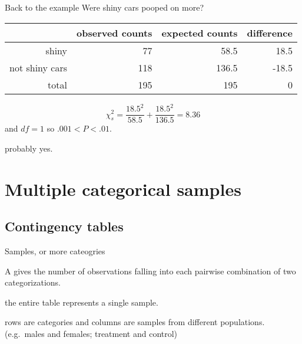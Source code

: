 \begin{frame}{Back to the example}
    Were shiny cars pooped on more?
    \begin{center}
        \begin{tabular}{rrrr}
            & observed counts & expected counts & difference \\
            \hline 
            shiny & 77 & 58.5 & 18.5 \\
            not shiny cars & 118 & 136.5 & -18.5 \\
            \hline
            total & 195 & 195  & 0 
        \end{tabular}
    \end{center}

    \vspace{2em}
    \[ \chi^2_s = \frac{ 18.5^2 }{ 58.5 } + \frac{ 18.5^2 }{ 136.5 } = 8.36 \]
    and $df=1$ so $.001<P<.01$.

    \vspace{2em}

     probably yes.

\end{frame}



\section{Multiple categorical samples}

\subsection{Contingency tables}

\begin{frame}{Samples, or more cateogries}

    A  gives the \alert{number} of observations
    falling into each pairwise \alert{combination} of two categorizations.

    \vspace{2em}

     the entire table represents a single sample.

    \vspace{2em}

     rows are \alert{categories} and columns are \alert{samples} from different populations. (e.g.\ males and females; treatment and control)

\end{frame}


